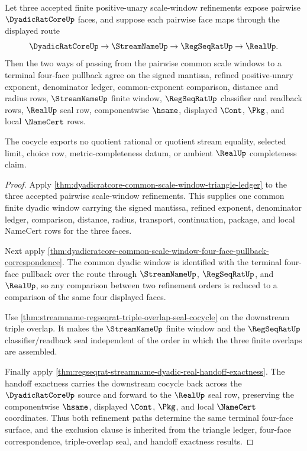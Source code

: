 \begin{theorem}
\label{thm:dyadicratcore-four-face-window-refinement-cocycle}
Let three accepted finite positive-unary scale-window refinements expose pairwise $\DyadicRatCoreUp$ faces, and suppose each pairwise face maps through the displayed route
$$
\DyadicRatCoreUp \to \StreamNameUp \to \RegSeqRatUp \to \RealUp .
$$
Then the two ways of passing from the pairwise common scale windows to a terminal four-face pullback agree on the signed mantissa, refined positive-unary exponent, denominator ledger, common-exponent comparison, distance and radius rows, $\StreamNameUp$ finite window, $\RegSeqRatUp$ classifier and readback rows, $\RealUp$ seal row, componentwise $\hsame$, displayed $\Cont$, $\Pkg$, and local $\NameCert$ rows.

The cocycle exports no quotient rational or quotient stream equality, selected limit, choice row, metric-completeness datum, or ambient $\RealUp$ completeness claim.
\end{theorem}
\begin{proof}
Apply \autoref{thm:dyadicratcore-common-scale-window-triangle-ledger} to the three accepted pairwise scale-window refinements. This supplies one common finite dyadic window carrying the signed mantissa, refined exponent, denominator ledger, comparison, distance, radius, transport, continuation, package, and local NameCert rows for the three faces.

Next apply \autoref{thm:dyadicratcore-common-scale-window-four-face-pullback-correspondence}. The common dyadic window is identified with the terminal four-face pullback over the route through $\StreamNameUp$, $\RegSeqRatUp$, and $\RealUp$, so any comparison between two refinement orders is reduced to a comparison of the same four displayed faces.

Use \autoref{thm:streamname-regseqrat-triple-overlap-seal-cocycle} on the downstream triple overlap. It makes the $\StreamNameUp$ finite window and the $\RegSeqRatUp$ classifier/readback seal independent of the order in which the three finite overlaps are assembled.

Finally apply \autoref{thm:regseqrat-streamname-dyadic-real-handoff-exactness}. The handoff exactness carries the downstream cocycle back across the $\DyadicRatCoreUp$ source and forward to the $\RealUp$ seal row, preserving the componentwise $\hsame$, displayed $\Cont$, $\Pkg$, and local $\NameCert$ coordinates. Thus both refinement paths determine the same terminal four-face surface, and the exclusion clause is inherited from the triangle ledger, four-face correspondence, triple-overlap seal, and handoff exactness results.
\end{proof}

